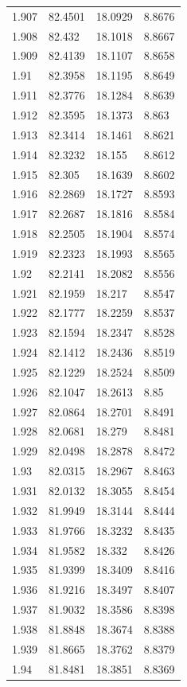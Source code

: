 \begin{tabular}{llll}
1.907 & 82.4501 & 18.0929 & 8.8676 \\
1.908 & 82.432 & 18.1018 & 8.8667 \\
1.909 & 82.4139 & 18.1107 & 8.8658 \\
1.91 & 82.3958 & 18.1195 & 8.8649 \\
1.911 & 82.3776 & 18.1284 & 8.8639 \\
1.912 & 82.3595 & 18.1373 & 8.863 \\
1.913 & 82.3414 & 18.1461 & 8.8621 \\
1.914 & 82.3232 & 18.155 & 8.8612 \\
1.915 & 82.305 & 18.1639 & 8.8602 \\
1.916 & 82.2869 & 18.1727 & 8.8593 \\
1.917 & 82.2687 & 18.1816 & 8.8584 \\
1.918 & 82.2505 & 18.1904 & 8.8574 \\
1.919 & 82.2323 & 18.1993 & 8.8565 \\
1.92 & 82.2141 & 18.2082 & 8.8556 \\
1.921 & 82.1959 & 18.217 & 8.8547 \\
1.922 & 82.1777 & 18.2259 & 8.8537 \\
1.923 & 82.1594 & 18.2347 & 8.8528 \\
1.924 & 82.1412 & 18.2436 & 8.8519 \\
1.925 & 82.1229 & 18.2524 & 8.8509 \\
1.926 & 82.1047 & 18.2613 & 8.85 \\
1.927 & 82.0864 & 18.2701 & 8.8491 \\
1.928 & 82.0681 & 18.279 & 8.8481 \\
1.929 & 82.0498 & 18.2878 & 8.8472 \\
1.93 & 82.0315 & 18.2967 & 8.8463 \\
1.931 & 82.0132 & 18.3055 & 8.8454 \\
1.932 & 81.9949 & 18.3144 & 8.8444 \\
1.933 & 81.9766 & 18.3232 & 8.8435 \\
1.934 & 81.9582 & 18.332 & 8.8426 \\
1.935 & 81.9399 & 18.3409 & 8.8416 \\
1.936 & 81.9216 & 18.3497 & 8.8407 \\
1.937 & 81.9032 & 18.3586 & 8.8398 \\
1.938 & 81.8848 & 18.3674 & 8.8388 \\
1.939 & 81.8665 & 18.3762 & 8.8379 \\
1.94 & 81.8481 & 18.3851 & 8.8369 \\

\end{tabular}
